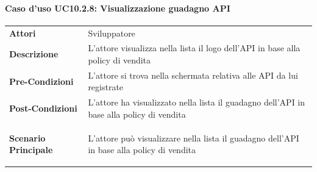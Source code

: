 \paragraph{Caso d'uso UC10.2.8: Visualizzazione guadagno API}
\label{UC10_2_8}

\begin{minipage}{\linewidth}
	\begin{tabular}{ l | p{11cm}}
		\hline
		\rowcolor{Gray}
		\multicolumn{2}{c}{UC10.2.8 - Visualizzazione guadagno API} \\
		\hline
		\textbf{Attori} & Sviluppatore \\
		\textbf{Descrizione} & L'attore visualizza nella lista il logo dell'API in base alla policy di vendita \\
		\textbf{Pre-Condizioni} & L'attore si trova nella schermata relativa alle API da lui registrate \\
		\textbf{Post-Condizioni} & L'attore ha visualizzato nella lista il guadagno dell'API in base alla policy di vendita \\
		\textbf{Scenario Principale} & 
		\begin{enumerate*}[label=(\arabic*.),itemjoin={\newline}]
			\item L'attore può visualizzare nella lista il guadagno dell'API in base alla policy di vendita
		\end{enumerate*}\\
	\end{tabular}
\end{minipage}